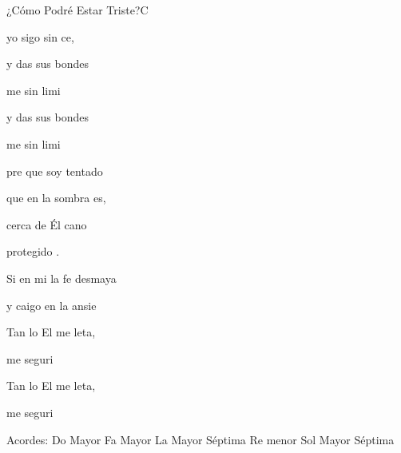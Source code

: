 \documentclass[12pt, spanish]{book}
\begin{document}
\begin{song}{¿Cómo Podré Estar Triste?}{C}
\begin{SBOpGroup}
            yo sigo sin ce,~

            y das sus bondes

            me  sin limi

            y das sus bondes

            me  sin limi
        \end{SBOpGroup}
        \vskip 20pt
        \begin{SBOpGroup}
            pre que soy tentado

             que en la sombra es,

             cerca de Él cano

             protegido .

            Si en mi la fe desmaya

            y caigo en la ansie~~

            Tan lo El me leta,

            me  seguri

            Tan lo El me leta,

            me  seguri
        \end{SBOpGroup}

        \ifChordBk
        \begin{SBOpGroup}
            Acordes:\break
            \upchord{\C}\qquad Do Mayor \hfill
            \upchord{\F}\qquad Fa Mayor \hfill\null\break
            \upchord{\Aseven}\qquad La Mayor S\'eptima \hfill
            \upchord{\Dm}\qquad Re menor  \hfill\null\break
            \upchord{\Gseven}Sol Mayor S\'eptima \hfill
        \end{SBOpGroup}
        \fi
    \end{song}
\end{document}
